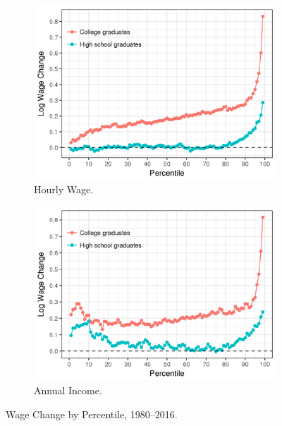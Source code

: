 \documentclass[notitlepage,12pt]{article}
\newcommand{\1}[1]{\ensuremath{\mathbb{1}\left( #1 \right)}}               %
\begin{document}
\begin{figure}[H]
  \centering
  \begin{subfigure}{.5\textwidth}
    \centering
    \caption{Hourly Wage.}
    \includegraphics[width=\textwidth]{figures/hour_wage_change.png}
  \end{subfigure}%
  \begin{subfigure}{.5\textwidth}
    \centering
    \caption{Annual Income.}
    \includegraphics[width=\textwidth]{figures/annual_wage_change.png}
  \end{subfigure}
  \caption{Wage Change by Percentile, 1980--2016.}
  \label{fig:wagechange_percentile}
\end{figure}
\end{document}
